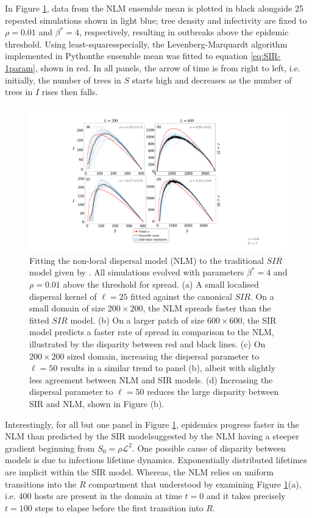 In Figure \ref{fig:SIR-fitting}, data from the NLM ensemble mean is plotted in black alongside 25 repeated simulations shown in light blue; 
tree density and infectivity are fixed to $\rho=0.01$ and $\beta^*=4$, respectively, resulting in outbreaks above the epidemic threshold.
Using least-squares\textemdash specially, the Levenberg-Marquardt algorithm \cite{more1978levenberg} implemented in Python\textemdash the ensemble mean was fitted to equation \ref{eq:SIR-1param}, shown in red.
In all panels, the arrow of time is from right to left, i.e. initially, the number of trees in $S$ starts high and decreases as the number of trees in $I$ rises then falls.
 
 \begin{figure}
    \centering
    \includegraphics[scale=0.425]{chapter5/figures/fig2-sir-fitting-step.pdf}
    \caption{Fitting the non-local dispersal model (NLM) to the traditional $SIR$ model given by \cite{kermack-model}. All simulations evolved with parameters $\beta^{*}=4$ and $\rho=0.01$ above the threshold for spread. (a) A small localised dispersal kernel of $\ell=25$ fitted against the canonical $SIR$. On a small domain of size $200\times 200$, the NLM spreads faster than the fitted $SIR$ model. (b) On a larger patch of size $600\times 600$, the SIR model predicts a faster rate of spread in comparison to the NLM, illustrated by the disparity between red and black lines. (c) On $200\times 200$ sized domain, increasing the dispersal parameter to $\ell=50$ results in a similar trend to panel (b), albeit with slightly less agreement between NLM and SIR models. (d) Increasing the dispersal parameter to $\ell=50$ reduces the large disparity between SIR and NLM, shown in Figure (b).}
    \label{fig:SIR-fitting}
\end{figure}

Interestingly, for all but one panel in Figure \ref{fig:SIR-fitting}, epidemics progress faster in the NLM than predicted by the SIR model\textemdash suggested by the NLM having a steeper gradient beginning from $S_0=\rho\mathcal{L}^2$. 
One possible cause of disparity between models is due to infectious lifetime dynamics. 
Exponentially distributed lifetimes are implicit within the SIR model.
Whereas, the NLM relies on uniform transitions into the $R$ compartment that understood by examining Figure \ref{fig:SIR-fitting}(a), i.e. 400 hosts are present in the domain at time $t=0$ and it takes precisely $t=100$ steps to elapse before the first transition into $R$.

